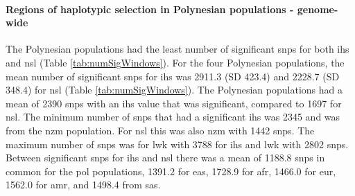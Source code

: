 \documentclass[twoside,openright]{report}
\let\oldparagraph\paragraph
\renewcommand{\paragraph}[1]{\oldparagraph{#1}\mbox{}}
\begin{document}
\paragraph{Regions of haplotypic selection in Polynesian populations -
genome-wide}\label{regions-of-haplotypic-selection-in-polynesian-populations---genome-wide}

The Polynesian populations had the least number of significant
\glspl{snp} for both \gls{ihs} and \gls{nsl} (Table
\ref{tab:numSigWindows}). For the four Polynesian populations, the mean
number of significant \glspl{snp} for \gls{ihs} was 2911.3 (SD 423.4)
and 2228.7 (SD 348.4) for \gls{nsl} (Table \ref{tab:numSigWindows}). The
Polynesian populations had a mean of 2390 \glspl{snp} with an \gls{ihs}
value that was significant, compared to 1697 for \gls{nsl}. The minimum
number of \glspl{snp} that had a significant \gls{ihs} was 2345 and was
from the \gls{nzm} population. For \gls{nsl} this was also \gls{nzm}
with 1442 \glspl{snp}. The maximum number of \glspl{snp} was for
\gls{lwk} with 3788 for \gls{ihs} and \gls{lwk} with 2802 \glspl{snp}.
Between significant \glspl{snp} for \gls{ihs} and \gls{nsl} there was a
mean of 1188.8 \glspl{snp} in common for the \gls{pol} populations,
1391.2 for \gls{eas}, 1728.9 for \gls{afr}, 1466.0 for \gls{eur}, 1562.0
for \gls{amr}, and 1498.4 from \gls{sas}.
\end{document}

